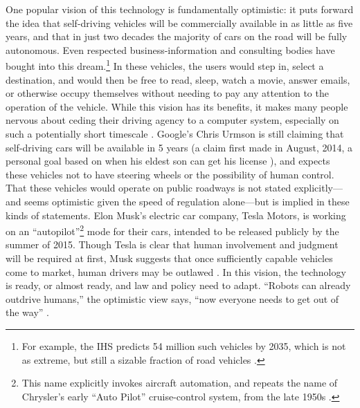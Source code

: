 
One popular vision of this technology is fundamentally optimistic: it
puts forward the
idea that self-driving vehicles will be commercially available in as little
as five years, and that in just two decades the majority of cars on the road will be
fully autonomous. Even respected business-information and consulting
bodies have bought into this dream.\footnote{For example, the IHS
  predicts 54 million such vehicles by 2035, which is not as extreme,
  but still a sizable fraction of road vehicles \cite{IHSstudy}.} In
these vehicles, the users would 
step in, select a destination, and would then be free to read, sleep,
watch a movie, answer emails, or otherwise occupy themselves without
needing to pay any attention to the operation of the vehicle. While this
vision has its benefits, it makes many people nervous about
ceding their driving agency to a computer system, especially on such a
potentially short timescale \cite{clytton}. Google's Chris Urmson is
still claiming that self-driving cars will be available in 5 years (a
claim first made in August, 2014, a personal goal based on when his
eldest son can get his license \cite{gomesObstacles}), and expects
these vehicles not to have steering wheels or the possibility of human
control. That these vehicles would operate on public roadways is not
stated explicitly---and seems optimistic given the speed of regulation
alone---but is implied in these kinds of statements. Elon Musk's
electric car company, Tesla Motors, is working on an 
``autopilot''\footnote{This name explicitly invokes aircraft
  automation, and repeats the name of Chrysler's early ``Auto Pilot''
cruise-control system, from the late 1950s
\cite{kesslerElon}.} mode for their cars, intended to be released publicly by
the summer of 2015.
Though Tesla is clear that human involvement and judgment will be
required at first, Musk suggests 
that once sufficiently capable vehicles 
come to market, human drivers may be
outlawed \cite{kingGoogle}.
In this vision, the technology is ready, or almost ready, and law and policy need to
adapt. ``Robots can already outdrive humans,'' the optimistic view says, ``now
everyone needs to get out of the way''
\cite{fisherInside}.




